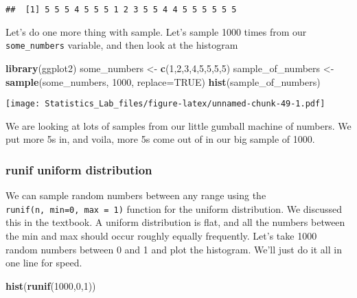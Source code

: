 \documentclass[
]{book}
\newenvironment{Shaded}{\begin{snugshade}}{\end{snugshade}}
\newcommand{\AttributeTok}[1]{\textcolor[rgb]{0.13,0.29,0.53}{#1}}
\newcommand{\ConstantTok}[1]{\textcolor[rgb]{0.56,0.35,0.01}{#1}}
\newcommand{\DecValTok}[1]{\textcolor[rgb]{0.00,0.00,0.81}{#1}}
\newcommand{\FunctionTok}[1]{\textcolor[rgb]{0.13,0.29,0.53}{\textbf{#1}}}
\newcommand{\NormalTok}[1]{#1}
\newcommand{\OtherTok}[1]{\textcolor[rgb]{0.56,0.35,0.01}{#1}}
\begin{document}
\begin{verbatim}
##  [1] 5 5 5 4 5 5 5 1 2 3 5 5 4 4 5 5 5 5 5 5
\end{verbatim}

Let's do one more thing with sample. Let's sample 1000 times from our
\texttt{some\_numbers} variable, and then look at the histogram

\begin{Shaded}
\begin{Highlighting}[]
\FunctionTok{library}\NormalTok{(ggplot2)}
\NormalTok{some\_numbers }\OtherTok{\textless{}{-}} \FunctionTok{c}\NormalTok{(}\DecValTok{1}\NormalTok{,}\DecValTok{2}\NormalTok{,}\DecValTok{3}\NormalTok{,}\DecValTok{4}\NormalTok{,}\DecValTok{5}\NormalTok{,}\DecValTok{5}\NormalTok{,}\DecValTok{5}\NormalTok{,}\DecValTok{5}\NormalTok{)}
\NormalTok{sample\_of\_numbers }\OtherTok{\textless{}{-}}\FunctionTok{sample}\NormalTok{(some\_numbers, }\DecValTok{1000}\NormalTok{, }\AttributeTok{replace=}\ConstantTok{TRUE}\NormalTok{)}
\FunctionTok{hist}\NormalTok{(sample\_of\_numbers)}
\end{Highlighting}
\end{Shaded}

\texttt{[image: Statistics\_Lab\_files/figure-latex/unnamed-chunk-49-1.pdf]}

We are looking at lots of samples from our little gumball machine of
numbers. We put more 5s in, and voila, more 5s come out of in our big
sample of 1000.

\hypertarget{runif-uniform-distribution}{%
\subsubsection{runif uniform distribution}\label{runif-uniform-distribution}}

We can sample random numbers between any range using the
\texttt{runif(n,\ min=0,\ max\ =\ 1)} function for the uniform distribution. We
discussed this in the textbook. A uniform distribution is flat, and all
the numbers between the min and max should occur roughly equally
frequently. Let's take 1000 random numbers between 0 and 1 and plot the
histogram. We'll just do it all in one line for speed.

\begin{Shaded}
\begin{Highlighting}[]
\FunctionTok{hist}\NormalTok{(}\FunctionTok{runif}\NormalTok{(}\DecValTok{1000}\NormalTok{,}\DecValTok{0}\NormalTok{,}\DecValTok{1}\NormalTok{))}
\end{Highlighting}
\end{Shaded}
\end{document}
